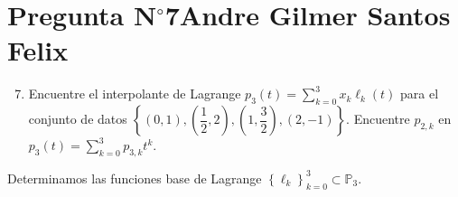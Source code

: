 \section{Pregunta N$^{\circ}$7\qquad Andre Gilmer Santos Felix}

\begin{frame}
	\begin{enumerate}\setcounter{enumi}{6}
		\item

		      Encuentre el interpolante de Lagrange
		      \begin{math}
			      p_{3}\left(t\right)=
			      \sum\limits_{k=0}^{3}
			      x_{k}
			      \ell_{k}\left(t\right)
		      \end{math}
		      para el conjunto de datos
		      \begin{math}
			      \left\{
			      \left(0,1\right),
			      \left(\dfrac{1}{2},2\right),
			      \left(1,\dfrac{3}{2}\right),
			      \left(2,-1\right)
			      \right\}
		      \end{math}.
		      Encuentre $p_{2,k}$ en
		      \begin{math}
			      p_{3}\left(t\right)=
			      \sum\limits_{k=0}^{3}
			      p_{3,k}t^{k}
		      \end{math}.
	\end{enumerate}

	\begin{solution}
		Determinamos las funciones base de Lagrange
		\begin{math}
			{\left\{\ell_{k}\right\}}^{3}_{k=0}\subset\mathbb{P}_{3}
		\end{math}.


\end{solution}
\end{frame}

